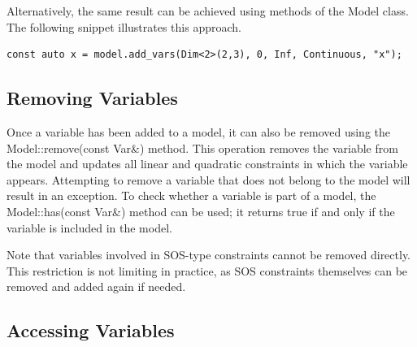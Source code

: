 Alternatively, the same result can be achieved using methods of the
\textsf{Model} class. The following snippet illustrates this approach.
%
\begin{lstlisting}
const auto x = model.add_vars(Dim<2>(2,3), 0, Inf, Continuous, "x");
\end{lstlisting}

\subsection{Removing Variables}

Once a variable has been added to a model, it can also be removed using the
\textsf{Model::remove(const Var\&)} method. This operation removes the
variable from the model and updates all linear and quadratic constraints in
which the variable appears. Attempting to remove a variable that does not
belong to the model will result in an exception. To check whether a variable
is part of a model, the \textsf{Model::has(const Var\&)} method can be used;
it returns \textsf{true} if and only if the variable is included in the model.

Note that variables involved in SOS-type constraints cannot be removed
directly. This restriction is not limiting in practice, as SOS constraints
themselves can be removed and added again if needed.

\subsection{Accessing Variables}

